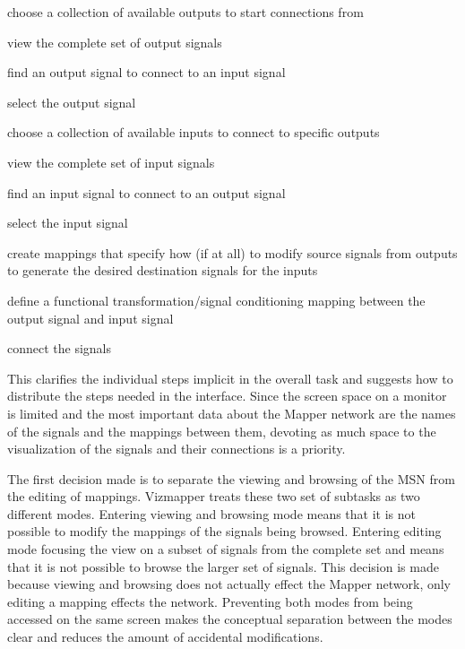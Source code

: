 \begin{description}
	\item choose a collection of available outputs to start connections from
    \begin{description}
        \item view the complete set of output signals
        \item find an output signal to connect to an input signal
        \item select the output signal
    \end{description}
	\item choose a collection of available inputs to connect to specific outputs
    \begin{description}
        \item view the complete set of input signals
        \item find an input signal to connect to an output signal
        \item select the input signal
    \end{description}
	\item create mappings that specify how (if at all) to modify source signals from outputs to generate the desired destination signals for the inputs
    \begin{description}
        \item define a functional transformation/signal conditioning mapping between the output signal and input signal 
        \item connect the signals
    \end{description}
\end{description}

This clarifies the individual steps implicit in the overall task and suggests how to distribute the steps needed in the interface. Since the screen space on a monitor is limited and the most important data about the Mapper network are the names of the signals and the mappings between them, devoting as much space to the visualization of the signals and their connections is a priority.

The first decision made is to separate the viewing and browsing of the MSN from the editing of mappings. Vizmapper treats these two set of subtasks as two different modes. Entering viewing and browsing mode means that it is not possible to modify the mappings of the signals being browsed. Entering editing mode focusing the view on a subset of signals from the complete set and means that it is not possible to browse the larger set of signals. This decision is made because viewing and browsing does not actually effect the Mapper network, only editing a mapping effects the network. Preventing both modes from being accessed on the same screen makes the conceptual separation between the modes clear and reduces the amount of accidental modifications.

